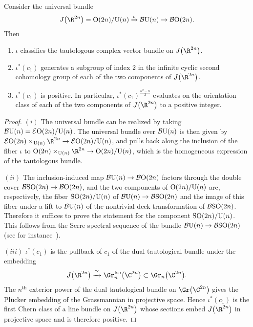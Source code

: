 \begin{Lemma}\label{positchern}
Consider the universal bundle
\[
J\big(\R^{2n}\big)={\rm O}(2n)/{\rm U}(n) \xrightarrow{\iota} {\mathcal B}{\rm U}(n) \to {\mathcal B}{\rm O}(2n).
\]
Then
\begin{enumerate}\itemsep=0pt
\item[$(i)$] $\iota$ classifies the tautologous complex vector bundle on $J\big(\R^{2n}\big)$.
\item[$(ii)$] $\iota^*(c_1)$ generates a subgroup of index $2$ in the infinite cyclic second cohomology group of
each of the two components of $J\big(\R^{2n}\big)$.
\item[$(iii)$] $\iota^*(c_1)$ is positive. In particular, $\iota^*(c_1)^{\frac{n^2-n}{2}}$ evaluates on the orientation class of each of the two components of $J\big(\R^{2n}\big)$ to a positive integer.
\end{enumerate}
\end{Lemma}
\begin{proof}
$(i)$ The universal bundle can be realized by taking ${\mathcal B}{\rm U}(n)={\mathcal E}{\rm O}(2n)/{\rm U}(n)$. The universal bundle over ${\mathcal B}{\rm U}(n)$ is then given by ${\mathcal E}{\rm O}(2n)\times_{{\rm U}(n)} \R^{2n} \to {\mathcal E}{\rm O}(2n)/{\rm U}(n)$, and pulls back along the inclusion of the fiber $\iota$ to ${\rm O}(2n) \times_{{\rm U}(n)} \R^{2n} \to {\rm O}(2n)/{\rm U}(n)$, which is the homogeneous expression of the tautologous bundle.

$(ii)$ The inclusion-induced map ${\mathcal B}{\rm U}(n) \to {\mathcal B}{\rm O}(2n)$ factors through the
double cover ${\mathcal B}{\rm SO}(2n) \allowbreak \to {\mathcal B}{\rm O}(2n)$, and the two components of ${\rm O}(2n)/{\rm U}(n)$ are,
respectively, the fiber ${\rm SO}(2n)/{\rm U}(n)$ of ${\mathcal B}{\rm U}(n) \to {\mathcal B}{\rm SO}(2n)$ and the image
of this fiber under a lift to ${\mathcal B}{\rm U}(n)$ of the nontrivial deck transformation of
${\mathcal B}{\rm SO}(2n)$. Therefore it suffices to prove the statement for the component
${\rm SO}(2n)/{\rm U}(n)$. This follows from the Serre spectral sequence of the bundle
${\mathcal B}{\rm U}(n) \to {\mathcal B}{\rm SO}(2n)$ (see for instance~\cite[Theorem~III.6.11]{MiTo}).

$(iii)$ $\iota^*(c_1)$ is the pullback of $c_1$ of the dual tautological bundle under the embedding
\[J\big(\R^{2n}\big) \xrightarrow{\cong} \Gr_n^{\rm Iso}\big(\C^{2n}\big) \subset \Gr_n\big(\C^{2n}\big).\]
The $n^{\mathrm{th}}$ exterior power of the dual tautological bundle on $\Gr\big(\C^{2n}\big)$ gives the
Pl\"ucker embedding of the Grassmannian in projective space. Hence $\iota^*(c_1)$ is the first
Chern class of a line bundle on $J\big(\R^{2n}\big)$ whose sections embed $J\big(\R^{2n}\big)$ in projective space and is therefore positive.\qedhere
\end{proof}

